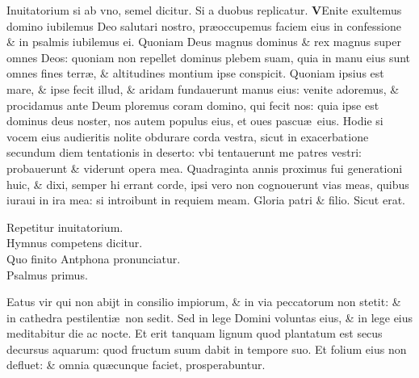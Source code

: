 \documentclass[a5paper,10pt]{book}
\def\ae{æ}
\begin{document}
\begin{multicols*}{2}
\color{red} Inuitatorium si ab vno, semel dicitur. Si a duobus replicatur. \color{black}
\vspace{-.25em}
\lettrine[lines=2]{\bfseries \color{red} V}{}Enite exultemus domino iubilemus Deo salutari nostro, pr\ae occupemus faciem eius in confessione \& in psalmis iubilemus ei.
\newline
\color{red} Q\color{black}uoniam Deus magnus dominus \& rex magnus super omnes %
Deos: quoniam non repellet dominus plebem suam, quia in manu eius sunt omnes fines terr\ae , \& altitudines montium ipse conspicit.
\newline
\color{red} Q\color{black}uoniam ipsius est mare, \& ipse fecit illud, \& aridam fundauerunt manus eius: venite adoremus, \& procidamus ante Deum ploremus coram domino, qui fecit nos: quia ipse est dominus deus noster, nos autem populus eius, et oues pascu\ae \ eius.
\newline
\color{red} H\color{black}odie si vocem eius audieritis nolite obdurare corda vestra, sicut in exacerbatione secundum diem tentationis in deserto: vbi tentauerunt me patres vestri: probauerunt \& viderunt opera mea.
\newline
\color{red} Q\color{black}uadraginta annis proximus fui generationi huic, \& dixi, semper hi errant corde, ipsi vero non cognouerunt vias meas, quibus iuraui in ira mea: si introibunt in requiem meam.
\newline
\color{red} G\color{black}loria patri \& filio. Sicut erat.
\vspace{-1em}
\begin{center} \color{red}
Repetitur inuitatorium.\\
Hymnus competens dicitur.\\
Quo finito Antphona pronunciatur.\\
\hypertarget{ps1}{Psalmus primus.}
\end{center}
\vspace{-1em}
Eatus vir qui non abijt in consilio impiorum, \& in via peccatorum non stetit: \& in cathedra pestilenti\ae \ non sedit.
\newline \color{red} S\color{black}ed in lege Domini voluntas eius, \& in lege eius meditabitur die ac nocte.
\newline \color{red} E\color{black}t erit tanquam lignum quod plantatum est secus decursus aquarum: quod fructum suum dabit in tempore suo.
\newline \color{red} E\color{black}t folium eius non defluet: \& omnia qu\ae cunque %
faciet, prosperabuntur.

\end{multicols*}
\end{document}
